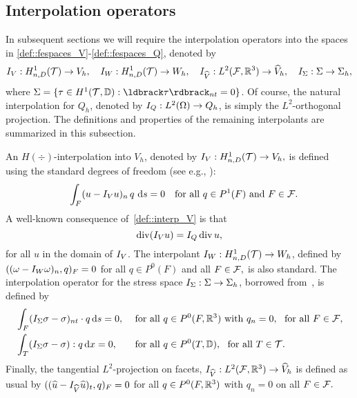 \subsection{Interpolation operators}\label{sec::interp}

In subsequent sections we will require the interpolation operators
into the spaces in \eqref{def::fespaces_V}-\eqref{def::fespaces_Q}, denoted by 
\[
  I_V: H^1_{n, D}(\mathcal{T})\rightarrow V_h,\quad
  I_W: H^1_{n, D}(\mathcal{T})\rightarrow W_h,\quad
  I_{\widehat{V}}: L^2(\mathcal{F}, \mathbb{R}^3)\rightarrow \widehat{V}_h, \quad
  I_\Sigma : \Sigma \rightarrow \Sigma_h,
\]
where $\Sigma = \{\tau \in H^{1}(\mesh, \dd):\jump{\tau}_{nt} = 0\}$.
Of course, the natural interpolation for $Q_h$, denoted by  $I_Q : L^2(\Omega) \rightarrow Q_h$, is simply the $L^2$-orthogonal projection.
The definitions and properties of the remaining interpolants
are summarized in this subsection.

An $H(\div)$-interpolation into $V_h$, denoted by $I_V: H^1_{n,
D}(\mathcal{T})\rightarrow V_h,$ is defined using the standard degrees of
freedom (see e.g., \cite[Proposition 2.3.2]{brezzi2012mixed}): 
\begin{align}
   \quad \int_{F} (u - I_V u)_n \,q\, \mathop{\mathrm{d} s} = 0 \quad \textrm{for all }
   q\in P^1(F) \textrm{ and } F\in\mathcal{F}.   \label{def::interp_V}
\end{align}
A well-known consequence of~\eqref{def::interp_V} is that
\begin{equation}
  \label{eq:commut}
  \operatorname{div} (I_V u) = I_Q \operatorname{div} u,   
\end{equation}
for all $u$ in the domain of $I_V$.
The interpolant $I_W: H^1_{n, D}(\mathcal{T})\rightarrow W_h$, defined by
$
  ((\omega - \IW \omega)_n, q)_F = 0  %
  $
for  all $ q\in P^0(F)$ and all $F\in\mathcal{F},$ is also standard.
The 
interpolation operator for the stress space
$I_\Sigma : \Sigma \rightarrow \Sigma_h$,
borrowed from~\cite{mcsI}, is defined by 
\begin{align}
  & \int_F(I_\Sigma\sigma - \sigma)_{nt} \cdot q \mathop{\mathrm{d} s}= 0, && \text{ for all } q\in P^0(F, \mathbb{R}^3) \text{ with }q_n=0,~\text{ for all } F\in\mathcal{F},  \label{def::interp_Sigma_vol} \\
  & \int_T(I_\Sigma\sigma - \sigma) : q \mathop{\mathrm{d} x}= 0, && \text{ for all } q\in P^0(T, \mathbb{D}),~\text{ for all } T\in\mathcal{T}. \label{def::interp_Sigma_edge}
\end{align}
Finally, the  tangential $L^2$-projection on facets, 
$I_{\widehat{V}}: L^2(\mathcal{F}, \mathbb{R}^3)\rightarrow \widehat{V}_h$ is defined as usual by $((\widehat{u} - I_{\widehat{V}} \widehat{u})_t,  q)_F = 0$
for all $q\in P^0(F, \mathbb{R}^3)$ with $ q_n=0$ on all  $F\in\mathcal{F}.$



